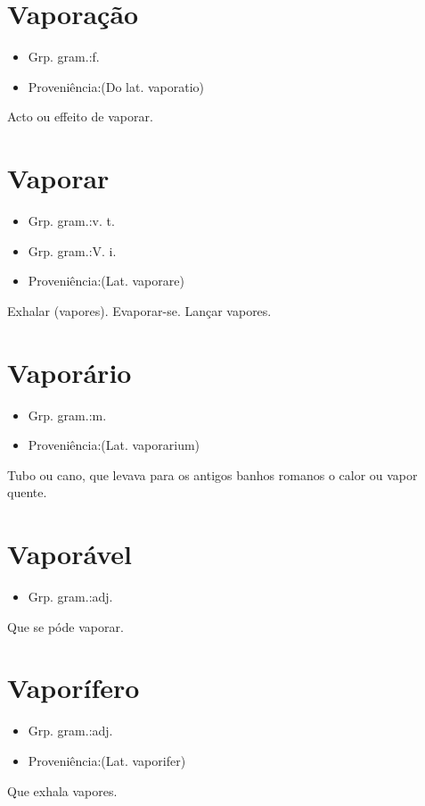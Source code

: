 \documentclass{article}
\begin{document}
\section{Vaporação}
\begin{itemize}
\item {Grp. gram.:f.}
\end{itemize}
\begin{itemize}
\item {Proveniência:(Do lat. \textunderscore vaporatio\textunderscore )}
\end{itemize}
Acto ou effeito de vaporar.
\section{Vaporar}
\begin{itemize}
\item {Grp. gram.:v. t.}
\end{itemize}
\begin{itemize}
\item {Grp. gram.:V. i.}
\end{itemize}
\begin{itemize}
\item {Proveniência:(Lat. \textunderscore vaporare\textunderscore )}
\end{itemize}
Exhalar (vapores).
Evaporar-se.
Lançar vapores.
\section{Vaporário}
\begin{itemize}
\item {Grp. gram.:m.}
\end{itemize}
\begin{itemize}
\item {Proveniência:(Lat. \textunderscore vaporarium\textunderscore )}
\end{itemize}
Tubo ou cano, que levava para os antigos banhos romanos o calor ou vapor quente.
\section{Vaporável}
\begin{itemize}
\item {Grp. gram.:adj.}
\end{itemize}
Que se póde vaporar.
\section{Vaporífero}
\begin{itemize}
\item {Grp. gram.:adj.}
\end{itemize}
\begin{itemize}
\item {Proveniência:(Lat. \textunderscore vaporifer\textunderscore )}
\end{itemize}
Que exhala vapores.
\end{document}
